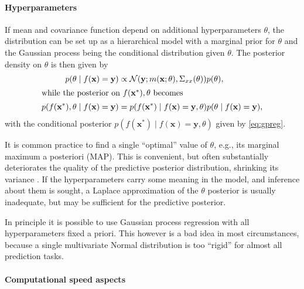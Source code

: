 \documentclass[a4paper]{article}
\theoremstyle{definition}
\let\oldmarginpar\marginpar
\renewcommand{\marginpar}[1]{\oldmarginpar{\sffamily\scriptsize #1}}
\renewcommand{\marginpar}[1]{\relax} %
\begin{document}
    \paragraph{Hyperparameters}
    
    If mean and covariance function depend on additional hyperparameters $\theta$, the distribution can be set up as a hierarchical model with a marginal prior for $\theta$ and the Gaussian process being the conditional distribution given $\theta$. The posterior density on $\theta$ is then given by
    \begin{align}
        p(\theta \mid f(\mathbf x) = \mathbf y) &\propto
        \mathcal N(\mathbf y; m(\mathbf x;\theta), \Sigma_{xx}(\theta))
        p(\theta), \label{eq:thetapost} \\
    \intertext{while the posterior on $f(\mathbf x^*),\theta$ becomes}
        p(f(\mathbf x^*),\theta \mid f(\mathbf x) = \mathbf y) &=
        p(f(\mathbf x^*) \mid f(\mathbf x) = \mathbf y, \theta)
        p(\theta \mid f(\mathbf x) = \mathbf y),
    \end{align}
    with the conditional posterior $p(f(\mathbf x^*) \mid f(\mathbf x) = \mathbf y, \theta)$ given by \autoref{eq:gpreg}.

    It is common practice to find a single ``optimal'' value of $\theta$, e.g., its marginal maximum a posteriori (MAP). This is convenient, but often substantially deteriorates the quality of the predictive posterior distribution, shrinking its variance \autocite[e.g.,][fig.~18.18, p.~713]{murphy2023}. If the hyperparameters carry some meaning in the model, and inference about them is sought, a Laplace approximation of the $\theta$ posterior is usually inadequate, but may be sufficient for the predictive posterior.

    In principle it is possible to use Gaussian process regression with all hyperparameters fixed a priori. This however is a bad idea in most circumstances, because a single multivariate Normal distribution is too ``rigid'' for almost all prediction tasks.\marginpar{If someone asks for a citation for this, I may find something at the beginning of \textcite{balog2016}.}

    \paragraph{Computational speed aspects}
    
\end{document}
